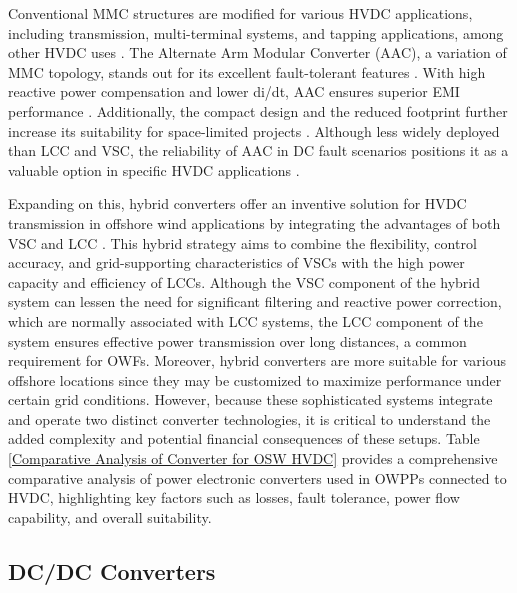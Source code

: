 \documentclass{ieeeaccess}
\begin{document}
Conventional MMC structures are modified for various HVDC applications, including transmission, multi-terminal systems, and tapping applications, among other HVDC uses \cite{sun2022beyond}. The Alternate Arm Modular Converter (AAC), a variation of MMC topology, stands out for its excellent %
fault-tolerant features \cite{wickramasinghe2018alternate}. With high reactive power compensation and lower di/dt, AAC ensures superior EMI performance \cite{sun2021hybrid}. Additionally, the compact design and the reduced footprint further increase its suitability for space-limited projects \cite{merlin2013alternate}. Although less widely deployed than LCC and VSC, the reliability of AAC in DC fault scenarios positions it as a valuable option in specific HVDC applications \cite{wickramasinghe2018alternate,merlin2013alternate}. 


Expanding on this, hybrid converters offer an inventive solution for HVDC transmission in offshore wind applications by integrating the advantages of both VSC and LCC \cite{yang2022critical,thi2013stability}. This hybrid strategy aims to combine the flexibility, control accuracy, and grid-supporting characteristics of VSCs with the high power capacity and efficiency of LCCs. Although the VSC component of the hybrid system can lessen the need for significant filtering and reactive power correction, which are normally associated with LCC systems, the LCC component of the system ensures effective power transmission over long distances, a common requirement for OWFs. Moreover, hybrid converters are more suitable for various offshore locations since they may be customized to maximize performance under certain grid conditions\cite{torres2012hybrid,li2013offshore}. However, because these sophisticated systems integrate and operate two distinct converter technologies, it is critical to understand the added complexity and potential financial consequences of these setups. Table
\ref{Comparative Analysis of Converter for OSW HVDC} provides a comprehensive comparative analysis of power electronic converters used in OWPPs connected to HVDC, highlighting key factors such as losses, fault tolerance, power flow capability, and overall suitability.

\subsection{\textbf{DC/DC Converters}}
\end{document}
